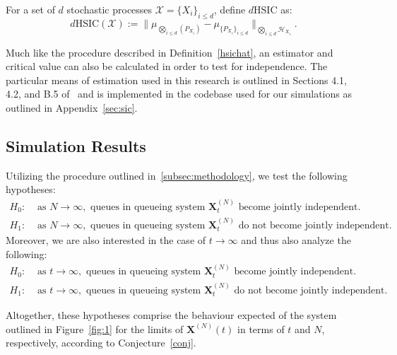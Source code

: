 \begin{definition}[$d$HSIC]

    \label{dhsic}
    For a set of $d$ stochastic processes $\mathcal{X} = \{X_{i}\}_{i \leq d}$, define $d\text{HSIC}$ as:
    \[d\text{HSIC}(\mathcal{X}) := \|\mu_{\bigotimes_{i \leq d}(P_{X_{i}})} - \mu_{\{P_{X_{i}}\}_{i \leq d}}\|_{\bigotimes_{i \leq d}\mathcal{H}_{X_{i}}}.\]
\end{definition}

Much like the procedure described in Definition~\ref{hsichat}, an estimator and critical value can also be calculated in order to test for independence.
The particular means of estimation used in this research is outlined in Sections 4.1, 4.2, and B.5 of~\cite{jointindep} and is
implemented in the codebase used for our simulations as outlined in Appendix~\ref{sec:sic}.

\subsection{Simulation Results}\label{subsec:simulation-results}
Utilizing the procedure outlined in~\ref{subsec:methodology}, we test the following hypotheses:
\begin{align*}
    \label{set 2}
    H_{0}:& \text{ as } N\rightarrow \infty, \text{ queues in queueing system } \mathbf{X}_{t}^{(N)} \text{ become jointly independent.}  \\
    H_{1}:& \text{ as } N\rightarrow \infty, \text{ queues in queueing system } \mathbf{X}_{t}^{(N)} \text{ do not become jointly independent.}
\end{align*}
Moreover, we are also interested in the case of $t \rightarrow \infty$ and thus also analyze the following:
\begin{align*}
    \label{set 1}
    H_{0}:& \text{ as } t\rightarrow \infty, \text{ queues in queueing system } \mathbf{X}_{t}^{(N)} \text{ become jointly independent.}  \\
    H_{1}:& \text{ as } t\rightarrow \infty, \text{ queues in queueing system } \mathbf{X}_{t}^{(N)} \text{ do not become jointly independent.}
\end{align*}

Altogether, these hypotheses comprise the behaviour expected of the system outlined in Figure~\ref{fig:1} for the limits of $\mathbf{X}^{(N)}(t)$
in terms of $t$ and $N$, respectively, according to Conjecture~\ref{conj}.

